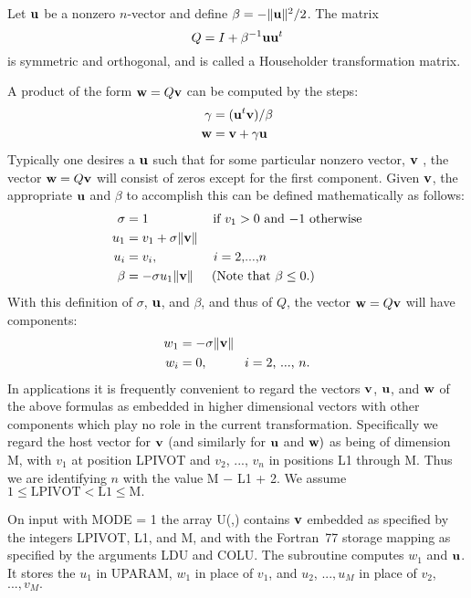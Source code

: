 \documentclass[twoside]{MATH77}
\begin{document}
Let ${\bf u}$ be a nonzero $n$-vector and define $\beta  = -\|{\bf u}\|^2/2$. The matrix
\begin{equation*}
Q = I + \beta ^{-1}{\bf uu}^t
\end{equation*}
is symmetric and orthogonal, and is called a Householder transformation
matrix.

A product of the form ${\bf w} = Q{\bf v}$ can be computed by the steps:
\begin{align*}
\gamma &= ({\bf u}^t{\bf v})/\beta\\
{\bf w} &= {\bf v} + \gamma {\bf u}
\end{align*}
Typically one desires a ${\bf u}$ such that for some particular nonzero vector, ${\bf v}$%
, the vector ${\bf w} = Q{\bf v}$ will consist of zeros except for the first component.
Given ${\bf v}$, the appropriate ${\bf u}$ and $\beta $ to accomplish this can be
defined mathematically as follows:
\begin{align*}
\sigma &= 1 \hspace{.7in} \text{if } v_1 > 0 \text{ and } {-}{1} \text{ otherwise}\\
u_1 &= v_1 + \sigma \|{\bf v}\|\\
u_i &= v_i, \hspace{.6in} i = 2{\text, ..., }n\\
\beta  &= -\sigma u_1\|{\bf v}\| \hspace{.2in} \text{(Note that }\beta  \leq 0.)
\end{align*}
With this definition of $\sigma $, ${\bf u}$, and $\beta $, and thus of $Q$,
the vector ${\bf w} = Q{\bf v}$ will have components:
\begin{align*}
w_1 &= -\sigma \|{\bf v}\|\\
w_i &= 0, \hspace{.4in} i = 2\text{, ..., }n.
\end{align*}
In applications it is frequently convenient to regard the vectors ${\bf v}$, ${\bf u}$,
and ${\bf w}$ of the above formulas as embedded in higher dimensional vectors with
other components which play no role in the current transformation.
Specifically we regard the host vector for ${\bf v}$ (and similarly for ${\bf u}$ and ${\bf w})
$ as being of dimension M, with $v_1$ at position LPIVOT and $v_2$, ..., $%
v_n$ in positions L1 through M. Thus we are identifying $n$ with the value
M $-$ L1 + 2. We assume $1 \leq \text{LPIVOT} < \text{L1} \leq \text{M}.$

On input with MODE = 1 the array U(,) contains ${\bf v}$ embedded as specified
by the integers LPIVOT, L1, and M, and with the Fortran~77 storage mapping
as specified by the arguments LDU and COLU. The subroutine computes $w_1$
and ${\bf u}$. It stores the $u_1$ in UPARAM, $w_1$ in place of $v_1$, and $u_2$, $%
...,u_M$ in place of $v_2$, $...,v_M.$
\end{document}
